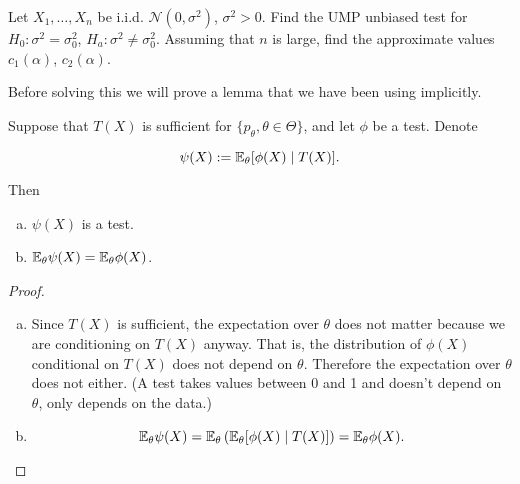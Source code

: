 \begin{example}

Let \(X_1, \ldots, X_n\) be i.i.d. \(\mathcal{N}(0, \sigma^2)\), \(\sigma^2 > 0\). Find the UMP unbiased test for \(H_0: \sigma^2 = \sigma_0^2\), \(H_a: \sigma^2 \neq \sigma_0^2\). Assuming that \(n\) is large, find the approximate values \(c_1 (\alpha)\), \(c_2 (\alpha)\).

\end{example}

Before solving this we will prove a lemma that we have been using implicitly.

\begin{lemma}

Suppose that \(T(X)\) is sufficient for \(\{p_\theta, \theta \in \Theta\}\), and let \(\phi\) be a test. Denote

\[
\psi(X) := \E_\theta [ \phi(X) \mid T(X)].
\]

Then 

\begin{enumerate}[(a)]

\item \(\psi(X)\) is a test.

\item \(\E_\theta \psi(X) = \E_\theta \phi(X)\). 

\end{enumerate}

\end{lemma}

\begin{proof}

\begin{enumerate}[(a)]

\item Since \(T(X)\) is sufficient, the expectation over \(\theta\) does not matter because we are conditioning on \(T(X)\) anyway. That is, the distribution of \(\phi(X)\) conditional on \(T(X)\) does not depend on \(\theta\). Therefore the expectation over \(\theta\) does not either. (A test takes values between 0 and 1 and doesn't depend on \(\theta\), only depends on the data.)

\item 

\[
\E_\theta \psi(X) = \E_\theta \left( \E_\theta [ \phi(X) \mid T(X)] \right) = \E_\theta \phi(X).
\]

\end{enumerate}

\end{proof}

